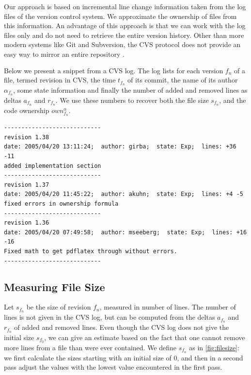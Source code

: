 Our approach is based on incremental line change information taken from the log files of the version control system. We approximate the ownership of files from this information. An advantage of this approach is that we can work with the log files only and do not need to retrieve the entire version history. Other than more modern systems like Git and Subversion, the CVS protocol does not provide an easy way to mirror an entire repository \cite{PromisesAndPerilsOfGIT}.  

Below we present a snippet from a CVS log. The log lists for each version $f_n$ of a file, termed revision in CVS, the time $t_{f_n}$ of its commit, the name of its author $\alpha_{f_n}$, some state information and finally the number of added and removed lines as deltas $a_{f_n}$ and $r_{f_n}$. We use these numbers to recover both the file size $s_{f_n}$, and the code ownership $own_{f_n}^\alpha$.

\begin{tiny}\begin{verbatim}
----------------------------
revision 1.38
date: 2005/04/20 13:11:24;  author: girba;  state: Exp;  lines: +36 -11
added implementation section
----------------------------
revision 1.37
date: 2005/04/20 11:45:22;  author: akuhn;  state: Exp;  lines: +4 -5
fixed errors in ownership formula
----------------------------
revision 1.36
date: 2005/04/20 07:49:58;  author: mseeberg;  state: Exp;  lines: +16 -16
Fixed math to get pdflatex through without errors.
----------------------------
\end{verbatim}\end{tiny}

\subsection{Measuring File Size}

Let $s_{f_n}$ be the size of revision $f_n$, measured in number of lines. The number of lines is not given in the CVS log, but can be computed from the deltas $a_{f_n}$ and $r_{f_n}$ of added and removed lines. Even though the CVS log does not give the initial size $s_{f_0}$, we can give an estimate based on the fact that one cannot remove more lines from a file than were ever contained. We define $s_{f_n}$ as in \autoref{fig:filesize}: we first calculate the sizes starting with an initial size of 0, and then in a second pass adjust the values with the lowest value encountered in the first pass.

